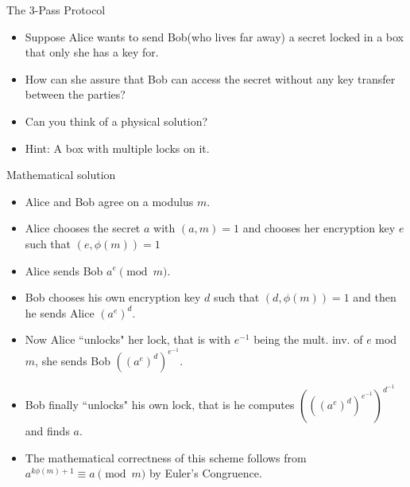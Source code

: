 \documentclass[ %
 usenames,dvipsnames,
aspectratio=169,11pt ]{beamer}
\newenvironment{stepitemize}{\begin{itemize}[<+->]}{\end{itemize} }
\begin{document}
\begin{frame}{The $3$-Pass Protocol}
    \begin{stepitemize}
    \item Suppose Alice wants to send Bob(who lives far away) a secret locked in a box that only she has a key for.
    \item How can she assure that Bob can access the secret without any key transfer between the parties?
    \item Can you think of a physical solution?
    \item Hint: A box with multiple locks on it. 
    \end{stepitemize}
\end{frame}

\begin{frame}{Mathematical solution}
\begin{stepitemize}
\item Alice and Bob agree on a modulus $m$.
\item Alice chooses the secret $a$ with $(a,m)=1$ and chooses her encryption key $e$ such that $(e, \phi(m))=1$
\item Alice sends Bob $a^e \pmod{m}$.
\item Bob chooses his own encryption key $d$ such that $(d, \phi(m))=1$ and then he sends Alice $(a^e)^d$.
\item Now Alice ``unlocks" her lock, that is with $e^{-1}$ being the mult. inv. of $e$ mod $m$, she sends Bob $((a^e)^d)^{e^{-1}}$.
\item Bob finally ``unlocks" his own lock, that is he computes
$(((a^e)^d)^{e^{-1}})^{d^{-1}}$ and finds $a$.
\item The mathematical correctness of this scheme follows from
$a^{k\phi(m)+1} \equiv a \pmod{m}$ by Euler's Congruence.
\end{stepitemize}
\end{frame}
\end{document}
